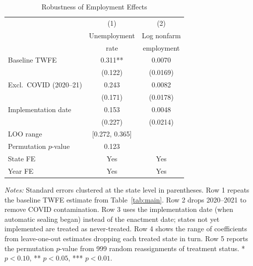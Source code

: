 \begin{table}[H]
\centering
\caption{Robustness of Employment Effects}
\begin{threeparttable}
\begin{tabular}{lcc}
\toprule
 & (1) & (2) \\
 & Unemployment & Log nonfarm \\
 & rate & employment \\
\midrule
Baseline TWFE & 0.311** & 0.0070 \\
 & (0.122) & (0.0169) \\
\addlinespace
Excl.\ COVID (2020--21) & 0.243 & 0.0082 \\
 & (0.171) & (0.0178) \\
\addlinespace
Implementation date & 0.153 & 0.0048 \\
 & (0.227) & (0.0214) \\
\addlinespace
LOO range & [0.272, 0.365] & \\
\addlinespace
Permutation $p$-value & 0.123 & \\
\midrule
State FE & Yes & Yes \\
Year FE & Yes & Yes \\
\bottomrule
\end{tabular}
\begin{tablenotes}[flushleft]
\small
\item \textit{Notes:} Standard errors clustered at the state level in parentheses. Row 1 repeats the baseline TWFE estimate from Table~\ref{tab:main}. Row 2 drops 2020--2021 to remove COVID contamination. Row 3 uses the implementation date (when automatic sealing began) instead of the enactment date; states not yet implemented are treated as never-treated. Row 4 shows the range of coefficients from leave-one-out estimates dropping each treated state in turn. Row 5 reports the permutation $p$-value from 999 random reassignments of treatment status. * $p<0.10$, ** $p<0.05$, *** $p<0.01$.
\end{tablenotes}
\end{threeparttable}
\label{tab:robust}
\end{table}

